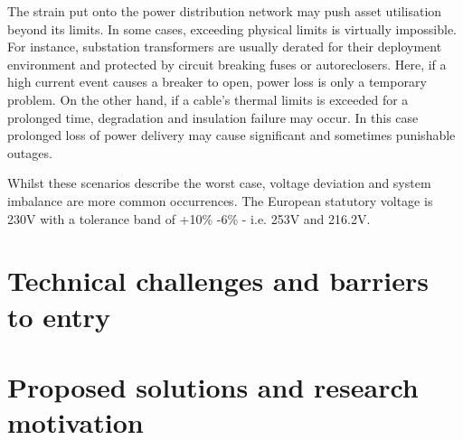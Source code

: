 The strain put onto the power distribution network may push asset utilisation beyond its limits.
In some cases, exceeding physical limits is virtually impossible.
For instance, substation transformers are usually derated for their deployment environment and protected by circuit breaking fuses or autoreclosers.
Here, if a high current event causes a breaker to open, power loss is only a temporary problem.
On the other hand, if a cable's thermal limits is exceeded for a prolonged time, degradation and insulation failure may occur.
In this case prolonged loss of power delivery may cause significant and sometimes punishable outages.

Whilst these scenarios describe the worst case, voltage deviation and system imbalance are more common occurrences.
The European statutory voltage is 230V with a tolerance band of +10\% -6\% - i.e. 253V and 216.2V.


\section{Technical challenges and barriers to entry}


\section{Proposed solutions and research motivation}

